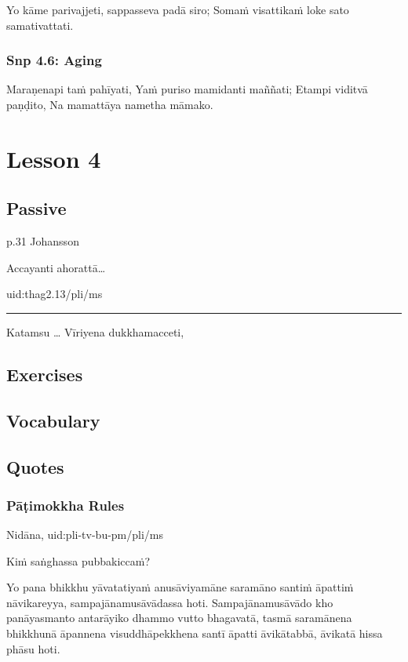 \documentclass[11pt,oneside]{memoir}
\begin{document}
Yo kāme parivajjeti,
sappasseva padā siro;
Somaṁ visattikaṁ loke
sato samativattati.

\subsection{Snp 4.6: Aging}
\label{sec:org7fea104}

Maraṇenapi taṁ pahīyati,
Yaṁ puriso mamidanti maññati;
Etampi viditvā paṇḍito,
Na mamattāya nametha māmako.

\chapter{Lesson 4}
\label{sec:org83d1455}
\section{Passive}
\label{sec:org6fd9ada}

p.31 Johansson

Accayanti ahorattā\ldots{}

uid:thag2.13/pli/ms

\noindent\rule{\textwidth}{0.5pt}

Katamsu \ldots{}
Vīriyena dukkhamacceti,

\section{Exercises}
\label{sec:org861d769}
\section{Vocabulary}
\label{sec:org8290005}
\section{Quotes}
\label{sec:org8d0e672}
\subsection{Pāṭimokkha Rules}
\label{sec:org9aa2c2e}

Nidāna, uid:pli-tv-bu-pm/pli/ms

Kiṁ saṅghassa pubbakiccaṁ?

Yo pana bhikkhu yāvatatiyaṁ anusāviyamāne saramāno santiṁ āpattiṁ nāvikareyya, sampajānamusāvādassa hoti. Sampajānamusāvādo kho panāyasmanto antarāyiko dhammo vutto bhagavatā, tasmā saramānena bhikkhunā āpannena visuddhāpekkhena santī āpatti āvikātabbā, āvikatā hissa phāsu hoti.
\end{document}

